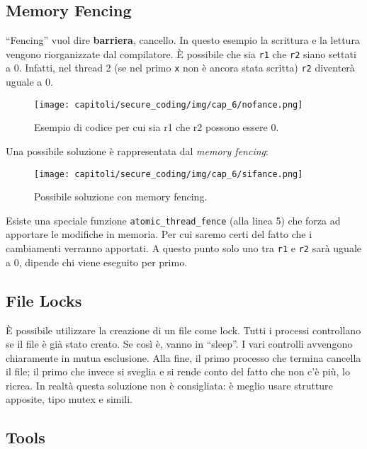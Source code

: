 \subsection{Memory Fencing}

``Fencing'' vuol dire \textbf{barriera}, cancello.
In questo esempio la scrittura e la lettura vengono riorganizzate dal compilatore.
È possibile che sia \verb|r1| che \verb|r2| siano settati a 0.
Infatti, nel thread 2 (se nel primo \verb|x| non è ancora stata scritta) \verb|r2|
diventerà uguale a 0.

\begin{figure}[H]
    \centering
    \texttt{[image: capitoli/secure\_coding/img/cap\_6/nofance.png]}
    \caption{Esempio di codice per cui sia r1 che r2 possono essere 0.}
\end{figure}

Una possibile soluzione è rappresentata dal \textit{memory fencing}:

\begin{figure}[H]
    \centering
    \texttt{[image: capitoli/secure\_coding/img/cap\_6/sifance.png]}
    \caption{Possibile soluzione con memory fencing.}
\end{figure}

Esiste una speciale funzione \verb|atomic_thread_fence| (alla linea 5) che forza ad apportare le modifiche in memoria.
Per cui saremo certi del fatto che i cambiamenti verranno apportati.
A questo punto solo uno tra \verb|r1| e \verb|r2| sarà uguale a 0, dipende chi viene eseguito per primo.


\subsection{File Locks}

È possibile utilizzare la creazione di un file come lock.
Tutti i processi controllano se il file è già stato creato.
Se così è, vanno in ``sleep''. I vari controlli avvengono chiaramente in mutua esclusione.
Alla fine, il primo processo che termina cancella il file; il primo che invece si sveglia e si rende conto del fatto che non c'è più, lo ricrea.
In realtà questa soluzione non è consigliata: è meglio usare strutture apposite, tipo mutex e simili.

\subsection{Tools}

